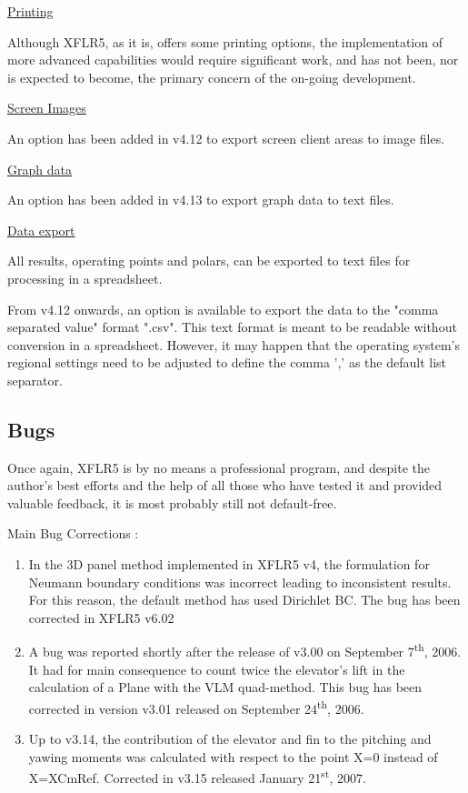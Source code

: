 \documentclass[a4paper,twoside,12pt,dvips]{article}
\begin{document}
\underline{Printing}

Although XFLR5, as it is, offers some printing options, the
implementation of more advanced capabilities would require significant
work, and has not been, nor is expected to become, the primary concern
of the on-going development.

\underline{Screen Images}

An option has been added in v4.12 to export screen client areas to
image files.

\underline{Graph data}

An option has been added in v4.13 to export graph data to text files.

\underline{Data export}

All results, operating points and polars, can be exported to text
files for processing in a spreadsheet.

From v4.12 onwards, an option is available to export the data to the
"comma separated value" format ".csv". This text format is meant
to be readable without conversion in a spreadsheet. However, it may
happen that the operating system's regional settings need to be
adjusted to define the comma ',' as the default list separator.


\subsection{Bugs}

Once again, XFLR5 is by no means a professional program, and despite
the author's best efforts and the help of all those who have tested it
and provided valuable feedback, it is most probably still not
default-free.

Main Bug Corrections :

\begin{enumerate}
\item In the 3D panel method implemented in XFLR5 v4, the formulation for
Neumann boundary conditions was incorrect leading to inconsistent
results. For this reason, the default method has used Dirichlet
BC.\newline
The bug has been corrected in XFLR5 v6.02
\item A bug was reported shortly after the release of v3.00 on September
7\textsuperscript{th}, 2006. It had for main consequence to count twice
the elevator{\textquoteright}s lift in the calculation of a Plane with
the VLM quad-method. This bug has been corrected in version v3.01
released on September 24\textsuperscript{th}, 2006.
\item Up to v3.14, the contribution of the elevator and fin to the pitching
and yawing moments was calculated with respect to the point X=0 instead
of X=XCmRef. Corrected in v3.15 released January
21\textsuperscript{st}, 2007.
\end{enumerate}
\end{document}
